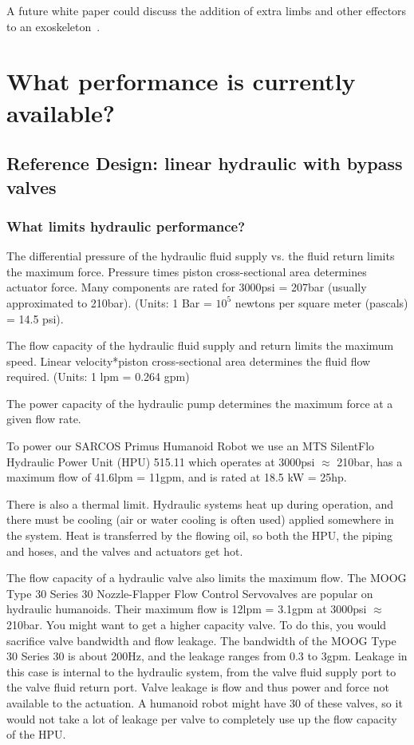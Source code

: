 \documentclass[letterpaper,12pt,fullpage]{article}
\begin{document}
A future white paper could discuss the addition of extra limbs and
other effectors to an exoskeleton~\cite{IEEE07139896}.





\section{What performance is currently available?}

\subsection{Reference Design: linear hydraulic with bypass valves}

\subsubsection{What limits hydraulic performance?}

The differential pressure of the hydraulic fluid supply vs. the fluid
return limits the maximum force. Pressure times piston cross-sectional area
determines actuator force.
Many components are rated for 3000psi = 207bar (usually approximated to
210bar).
(Units: 1 Bar = $10^5$ newtons per square meter (pascals) = 14.5 psi).

The flow capacity of the hydraulic fluid supply and return limits
the maximum speed. Linear velocity*piston cross-sectional area determines 
the fluid flow required.
(Units: 1 lpm = 0.264 gpm)

The power capacity of the hydraulic pump determines the maximum force
at a given flow rate.

To power our SARCOS Primus Humanoid Robot we use an
MTS SilentFlo Hydraulic Power Unit (HPU) 515.11
which operates at 3000psi $\approx$ 210bar,
has a maximum flow of 41.6lpm = 11gpm, and is rated at
18.5 kW = 25hp.

There is also a thermal limit. Hydraulic systems heat up during operation,
and there must be cooling (air or water cooling is often used)
applied somewhere in the system. Heat is transferred by the flowing oil,
so both the HPU, the piping and hoses, and the valves and actuators get hot.

The flow capacity of a hydraulic valve also limits the maximum flow.
The MOOG Type 30 Series 30 Nozzle-Flapper Flow Control Servovalves
are popular on hydraulic humanoids. Their maximum flow is
12lpm = 3.1gpm at 3000psi $\approx$ 210bar.
You might want to get a higher capacity valve. To do this, you
would sacrifice valve bandwidth and flow leakage.
The bandwidth of the MOOG Type 30
Series 30 is about 200Hz, and the leakage ranges from
0.3 to 3gpm. Leakage in this case is internal to the hydraulic
system, from the valve fluid supply port to the valve fluid return port.
Valve leakage is flow and thus power and force
not available to the actuation.
A humanoid robot might have 30 of these valves,
so it would not take a lot of leakage per valve to completely
use up the flow capacity of the HPU.
\end{document}
